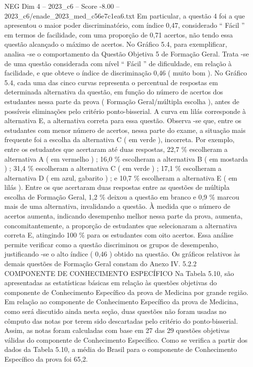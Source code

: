\begin{textsample}{NEG Dim 4 – 2023\_c6 – Score -8.00 – 2023\_c6/enade\_2023\_med\_c56e7c1ea6.txt}
Em particular, a questão 4 foi a que apresentou o maior poder discriminatório, com índice 0,47, considerado “ Fácil ” em termos de facilidade, com uma proporção de 0,71 acertos, não tendo essa questão alcançado o máximo de acertos.
No Gráfico 5.4, para exemplificar, analisa -se o comportamento da Questão Objetiva 5 de Formação Geral.
Trata -se de uma questão considerada com nível “ Fácil ” de dificuldade, em relação à facilidade, e que obteve o índice de discriminação 0,46 ( muito bom ).
No Gráfico 5.4, cada uma das cinco curvas representa o percentual de respostas em determinada alternativa da questão, em função do número de acertos dos estudantes nessa parte da prova ( Formação Geral/múltipla escolha ), antes de possíveis eliminações pelo critério ponto-bisserial.
A curva em lilás corresponde à alternativa E, a alternativa correta para essa questão.
Observa -se que, entre os estudantes com menor número de acertos, nessa parte do exame, a situação mais frequente foi a escolha da alternativa C ( em verde ), incorreta.
Por exemplo, entre os estudantes que acertaram até duas respostas, 22,7 \% escolheram a alternativa A ( em vermelho ) ; 16,0 \% escolheram a alternativa B ( em mostarda ) ; 31,4 \% escolheram a alternativa C ( em verde ) ; 17,1 \% escolheram a alternativa D ( em azul, gabarito ) ; e 10,7 \% escolheram a alternativa E ( em lilás ).
Entre os que acertaram duas respostas entre as questões de múltipla escolha de Formação Geral, 1,2 \% deixou a questão em branco e 0,9 \% marcou mais de uma alternativa, invalidando a questão.
À medida que o número de acertos aumenta, indicando desempenho melhor nessa parte da prova, aumenta, concomitantemente, a proporção de estudantes que selecionaram a alternativa correta E, atingindo 100 \% para os estudantes com oito acertos.
Essa análise permite verificar como a questão discriminou os grupos de desempenho, justificando -se o alto índice ( 0,46 ) obtido na questão.
Os gráficos relativos às demais questões de Formação Geral constam do Anexo IV. 5.2.2 COMPONENTE DE CONHECIMENTO ESPECÍFICO Na Tabela 5.10, são apresentadas as estatísticas básicas em relação às questões objetivas do componente de Conhecimento Específico da prova de Medicina por grande região.
Em relação ao componente de Conhecimento Específico da prova de Medicina, como será discutido ainda nesta seção, duas questões não foram usadas no cômputo das notas por terem sido descartadas pelo critério do ponto-bisserial.
Assim, as notas foram calculadas com base em 27 das 29 questões objetivas válidas do componente de Conhecimento Específico.
Como se verifica a partir dos dados da Tabela 5.10, a média do Brasil para o componente de Conhecimento Específico da prova foi 65,2.

\end{textsample}
